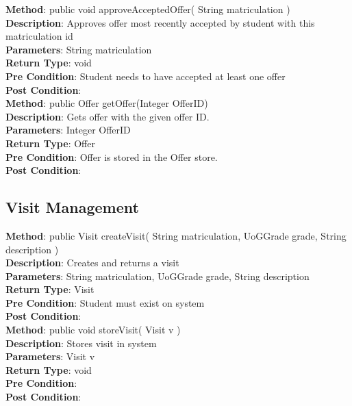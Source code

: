 \documentclass{l3deliverable}
\begin{document}
\textbf{Method}: public void approveAcceptedOffer( String matriculation )\\
\textbf{Description}: Approves offer most recently accepted by student with this matriculation id\\
\textbf{Parameters}: String matriculation\\
\textbf{Return Type}: void\\
\textbf{Pre Condition}: Student needs to have accepted at least one offer \\
\textbf{Post Condition}:\\

\textbf{Method}: public Offer getOffer(Integer OfferID)\\
\textbf{Description}: Gets offer with the given offer ID.\\
\textbf{Parameters}: Integer OfferID\\
\textbf{Return Type}: Offer\\
\textbf{Pre Condition}: Offer is stored in the Offer store.\\
\textbf{Post Condition}:\\

\subsection{Visit Management}
\textbf{Method}: public Visit createVisit( String matriculation, UoGGrade grade, String description )\\
\textbf{Description}: Creates and returns a visit\\
\textbf{Parameters}: String matriculation, UoGGrade grade, String description\\
\textbf{Return Type}: Visit\\
\textbf{Pre Condition}: Student must exist on system\\
\textbf{Post Condition}:\\

\textbf{Method}: public void storeVisit( Visit v )\\
\textbf{Description}: Stores visit in system\\
\textbf{Parameters}: Visit v\\
\textbf{Return Type}: void\\
\textbf{Pre Condition}:\\
\textbf{Post Condition}:\\

\end{document}
